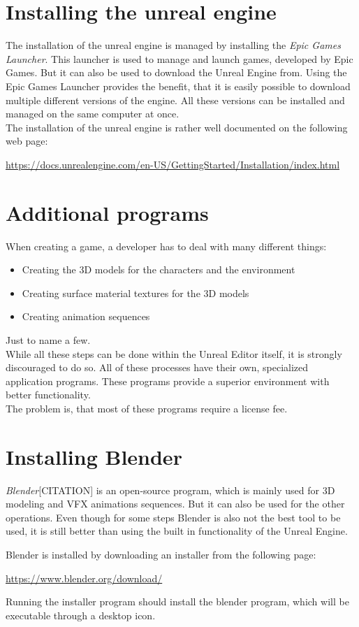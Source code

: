 \section{Installing the unreal engine}

The installation of the unreal engine is managed by installing the \textit{Epic Games Launcher}. This launcher is used to manage and launch games, developed by Epic Games. But it can also be used to download the Unreal Engine from. Using the Epic Games Launcher provides the benefit, that it is easily possible to download multiple different versions of the engine. All these versions can be installed and managed on the same computer at once.\\
The installation of the unreal engine is rather well documented on the following web page:

\url{https://docs.unrealengine.com/en-US/GettingStarted/Installation/index.html}

\section{Additional programs}

When creating a game, a developer has to deal with many different things:
\begin{itemize}
\item Creating the 3D models for the characters and the environment
\item Creating surface material textures for the 3D models
\item Creating animation sequences
\end{itemize}

Just to name a few.\\
While all these steps can be done within the Unreal Editor itself, it is strongly discouraged to do so. All of these processes have their own, specialized application programs. These programs provide a superior environment with better functionality.\\
The problem is, that most of these programs require a license fee.

\section{Installing Blender}

\textit{Blender}[CITATION] is an open-source program, which is mainly used for 3D modeling and VFX animations sequences. But it can also be used for the other operations. Even though for some steps Blender is also not the best tool to be used, it is still better than using the built in functionality of the Unreal Engine.

Blender is installed by downloading an installer from the following page:

\url{https://www.blender.org/download/}

Running the installer program should install the blender program, which will be executable through a desktop icon.